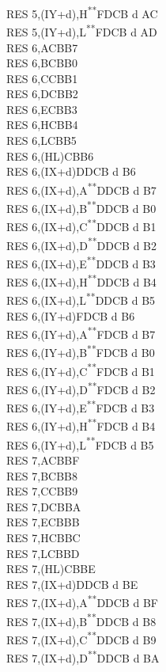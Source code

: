 \documentclass[12pt,twoside,openright,a4paper]{book}
\newcommand{\UNDOC}{\textnormal{\textsuperscript{**}}}
\begin{document}
\begin{multicols}{3}
{\begin{tabbing}
		RES 5,(IY+d),H\UNDOC\>FDCB d AC\\
		RES 5,(IY+d),L\UNDOC\>FDCB d AD\\
		RES 6,A\>CBB7\\
		RES 6,B\>CBB0\\
		RES 6,C\>CBB1\\
		RES 6,D\>CBB2\\
		RES 6,E\>CBB3\\
		RES 6,H\>CBB4\\
		RES 6,L\>CBB5\\
		RES 6,(HL)\>CBB6\\
		RES 6,(IX+d)\>DDCB d B6\\
		RES 6,(IX+d),A\UNDOC\>DDCB d B7\\
		RES 6,(IX+d),B\UNDOC\>DDCB d B0\\
		RES 6,(IX+d),C\UNDOC\>DDCB d B1\\
		RES 6,(IX+d),D\UNDOC\>DDCB d B2\\
		RES 6,(IX+d),E\UNDOC\>DDCB d B3\\
		RES 6,(IX+d),H\UNDOC\>DDCB d B4\\
		RES 6,(IX+d),L\UNDOC\>DDCB d B5\\
		RES 6,(IY+d)\>FDCB d B6\\
		RES 6,(IY+d),A\UNDOC\>FDCB d B7\\
		RES 6,(IY+d),B\UNDOC\>FDCB d B0\\
		RES 6,(IY+d),C\UNDOC\>FDCB d B1\\
		RES 6,(IY+d),D\UNDOC\>FDCB d B2\\
		RES 6,(IY+d),E\UNDOC\>FDCB d B3\\
		RES 6,(IY+d),H\UNDOC\>FDCB d B4\\
		RES 6,(IY+d),L\UNDOC\>FDCB d B5\\
		RES 7,A\>CBBF\\
		RES 7,B\>CBB8\\
		RES 7,C\>CBB9\\
		RES 7,D\>CBBA\\
		RES 7,E\>CBBB\\
		RES 7,H\>CBBC\\
		RES 7,L\>CBBD\\
		RES 7,(HL)\>CBBE\\
		RES 7,(IX+d)\>DDCB d BE\\
		RES 7,(IX+d),A\UNDOC\>DDCB d BF\\
		RES 7,(IX+d),B\UNDOC\>DDCB d B8\\
		RES 7,(IX+d),C\UNDOC\>DDCB d B9\\
		RES 7,(IX+d),D\UNDOC\>DDCB d BA\\

\end{tabbing}}
\end{multicols}
\end{document}
